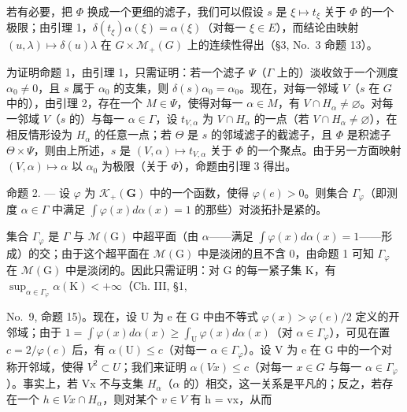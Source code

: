 若有必要，把 \(\Phi\) 换成一个更细的滤子，我们可以假设 \(s\) 是 \(\xi \mapsto t_{\xi}\) 关于 \(\Phi\) 的一个极限；由引理 1，\(\delta(t_{\xi})\alpha(\xi) = \alpha(\xi)\)（对每一 \(\xi \in E\)），而结论由映射 \((u,\lambda) \mapsto \delta(u)\lambda\) 在 \(G \times \mathcal{M}_{+}(G)\) 上的连续性得出（§3, No.~3 命题 13）。

为证明命题 1，由引理 1，只需证明：若一个滤子 \(\Psi\)（\(\Gamma\) 上的）淡收敛于一个测度 \(\alpha_0 \neq 0\)，且 \(s\) 属于 \(\alpha_0\) 的支集，则 \(\delta(s)\alpha_0 = \alpha_0\)。现在，对每一邻域 \(V\)（\(s\) 在 \(G\) 中的），由引理 2，存在一个 \(M \in \Psi\)，使得对每一 \(\alpha \in M\)，有 \(V \cap H_\alpha \neq \varnothing\)。对每一邻域 \(V\)（\(s\) 的）与每一 \(\alpha \in \Gamma\)，设 \(t_{V,\alpha}\) 为 \(V \cap H_\alpha\) 的一点（若 \(V \cap H_\alpha \neq \varnothing\)），在相反情形设为 \(H_\alpha\) 的任意一点；若 \(\Theta\) 是 \(s\) 的邻域滤子的截滤子，且 \(\Phi\) 是积滤子 \(\Theta \times \Psi\)，则由上所述，\(s\) 是 \((V,\alpha) \mapsto t_{V,\alpha}\) 关于 \(\Phi\) 的一个聚点。由于另一方面映射 \((V,\alpha) \mapsto \alpha\) 以 \(\alpha_0\) 为极限（关于 \(\Phi\)），命题由引理 3 得出。

命题 2. --- 设 \(\varphi\) 为 \(\mathcal{K}_{+}(\mathbf{G})\) 中的一个函数，使得 \(\varphi(e) > 0\)。则集合 \(\Gamma_{\varphi}\)（即测度 \(\alpha \in \Gamma\) 中满足 \(\int \varphi(x) d\alpha(x) = 1\) 的那些）对淡拓扑是紧的。

集合 \(\Gamma_{\varphi}\) 是 \(\Gamma\) 与 \(\mathcal{M}(\mathrm{G})\) 中超平面（由 \(\alpha\)——满足 \(\int \varphi(x)d\alpha(x)=1\)——形成）的交；由于这个超平面在 \(\mathcal{M}(\mathrm{G})\) 中是淡闭的且不含 0，由命题 1 可知 \(\Gamma_{\varphi}\) 在 \(\mathcal{M}(\mathrm{G})\) 中是淡闭的。因此只需证明：对 G 的每一紧子集 K，有 \(\sup_{\alpha\in\Gamma_{\varphi}}\alpha(\mathrm{K})<+\infty\)（Ch. III, §1,

No.~9, 命题 15)。现在，设 U 为 e 在 G 中由不等式 \(\varphi(x) > \varphi(e)/2\) 定义的开邻域；由于 \(1 = \int \varphi(x) d\alpha(x) \geqslant \int_{\mathrm{U}} \varphi(x) d\alpha(x)\)（对 \(\alpha \in \Gamma_{\varphi}\)），可见在置 \(c = 2/\varphi(e)\) 后，有 \(\alpha(\mathrm{U}) \leqslant c\)（对每一 \(\alpha \in \Gamma_{\varphi}\)）。设 V 为 e 在 G 中的一个对称开邻域，使得 \(V^{2} \subset U\)；我们来证明 \(\alpha(Vx) \leqslant c\)（对每一 \(x \in G\) 与每一 \(\alpha \in \Gamma_{\varphi}\)）。事实上，若 Vx 不与支集 \(H_{\alpha}\)（\(\alpha\) 的）相交，这一关系是平凡的；反之，若存在一个 \(h \in Vx \cap H_{\alpha}\)，则对某个 \(v \in V\) 有 h = vx，从而

